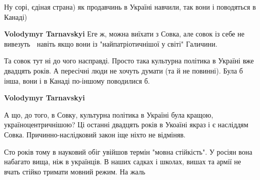 \begin{itemize}
\begin{itemize}
 
Ну сорі, єдіная страна) як продавчинь в Україні навчили, так вони і поводяться в Канаді)

 
\textbf{Volodymyr Tarnavskyi} Еге ж, можна виїхати з Совка, але совок із себе не вивезуть 🙁 навіть якщо вони із "найпатріотичнішої у світі" Галичини.

 

Та совок тут ні до чого насправді. Просто така культурна політика в Україні вже
двадцять років. А пересічні люди не хочуть думати (та й не повинні). Була б
інша, вони і в Канаді по-іншому поводилися б.


 
\textbf{Volodymyr Tarnavskyi} 

А що, до того, в Совку, культурна політика в Україні була кращою,
україноцентричнішою? Ці останні двадцять років в Укоаїні якраз і є насліддям
Совка. Причинно-наслідковий закон іще ніхто не відміняв.
\end{itemize}

 

Сто років тому в науковий обіг увійшов термін "мовна стійкість". У росіян вона
набагато вища, ніж в українців. В наших садках і школах, вишах та армії не
вчать стійко тримати мовний режим. На жаль


\end{itemize}
